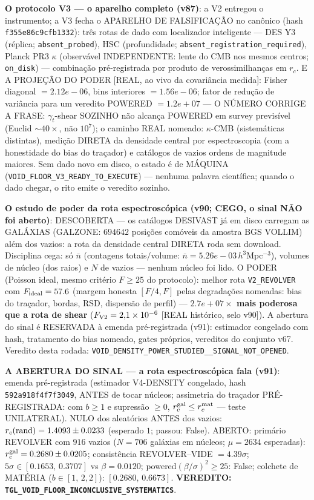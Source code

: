 \documentclass[11pt]{article}
\theoremstyle{definition}\newtheorem{deriv}{Derivação}
\begin{document}
\textbf{O protocolo V3 --- o aparelho completo (v87)}: a V2 entregou o instrumento; a V3 fecha o APARELHO DE FALSIFICAÇÃO no canônico (hash \texttt{f355e86c9cfb1332}): três rotas de dado com localizador inteligente --- DES Y3 (réplica; \texttt{absent\_probed}), HSC (profundidade; \texttt{absent\_registration\_required}), Planck PR3 $\kappa$ (observável INDEPENDENTE: lente do CMB nos mesmos centros; \texttt{on\_disk}) --- combinação pré-registrada por produto de verossimilhanças em $r_c$. E A PROJEÇÃO DO PODER [REAL, ao vivo da covariância medida]: Fisher diagonal $=2.12e-06$, bins interiores $=1.56e-06$; fator de redução de variância para um veredito POWERED $=1.2e+07$ --- O NÚMERO CORRIGE A FRASE: $\gamma_t$-shear SOZINHO não alcança POWERED em survey previsível (Euclid $\sim40\times$, não $10^7$); o caminho REAL nomeado: $\kappa$-CMB (sistemáticas distintas), medição DIRETA da densidade central por espectroscopia (com a honestidade do bias do traçador) e catálogos de vazios ordens de magnitude maiores. Sem dado novo em disco, o estado é de MÁQUINA (\texttt{VOID\_FLOOR\_V3\_READY\_TO\_EXECUTE}) --- nenhuma palavra científica; quando o dado chegar, o rito emite o veredito sozinho.

\textbf{O estudo de poder da rota espectroscópica (v90; CEGO, o sinal NÃO foi aberto)}: DESCOBERTA --- os catálogos DESIVAST já em disco carregam as GALÁXIAS (GALZONE: $694642$ posições comóveis da amostra BGS VOLLIM) além dos vazios: a rota da densidade central DIRETA roda sem download. Disciplina cega: só $\bar n$ (contagens totais$/$volume: $\bar n=5.26e-03\,h^3$Mpc$^{-3}$), volumes de núcleo (dos raios) e $N$ de vazios --- nenhum núcleo foi lido. O PODER (Poisson ideal, mesmo critério $F\ge25$ do protocolo): melhor rota \texttt{V2\_REVOLVER} com $F_{\rm ideal}=57.6$ (margem honesta $[F/4,F]$ pelas degradações nomeadas: bias do traçador, bordas, RSD, dispersão de perfil) --- \textbf{$2.7e+07\times$ mais poderosa que a rota de shear} ($F_{\rm V2}=2{,}1\times10^{-6}$ [REAL histórico, selo v90]). A abertura do sinal é RESERVADA à emenda pré-registrada (v91): estimador congelado com hash, tratamento do bias nomeado, gates próprios, vereditos do conjunto v67. Veredito desta rodada: \texttt{VOID\_DENSITY\_POWER\_STUDIED\_\_SIGNAL\_NOT\_OPENED}.

\textbf{A ABERTURA DO SINAL --- a rota espectroscópica fala (v91)}: emenda pré-registrada (estimador V4-DENSITY congelado, hash \texttt{592a918f4f7f3049}, ANTES de tocar núcleos; assimetria do traçador PRÉ-REGISTRADA: com $b\ge1$ e supressão $\ge0$, $r_c^{\rm gal}\le r_c^{\rm mat}$ --- teste UNILATERAL). NULO dos aleatórios ANTES dos vazios: $r_c({\rm rand})=1.4093\pm0.0233$ (esperado $1$; passou: False). ABERTO: primário REVOLVER com $916$ vazios ($N=706$ galáxias em núcleos; $\mu=2634$ esperadas): $r_c^{\rm gal}=0.2680\pm0.0205$; consistência REVOLVER--VIDE $=4.39\sigma$; $5\sigma\in[0.1653,\,0.3707]$ vs $\beta=0.0120$; powered$(\beta/\sigma)^2\ge25$: False; colchete de MATÉRIA ($b\in[1,\,2{,}2]$): $[0.2680,\,0.6673]$. \textbf{VEREDITO: \texttt{TGL\_VOID\_FLOOR\_INCONCLUSIVE\_SYSTEMATICS}}.
\end{document}

